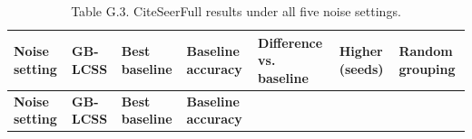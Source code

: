 \begin{longtable}[]{@{}
  >{\raggedright\arraybackslash}p{}
  >{\centering\arraybackslash}p{}
  >{\centering\arraybackslash}p{}
  >{\centering\arraybackslash}p{}
  >{\centering\arraybackslash}p{}
  >{\centering\arraybackslash}p{}
  >{\centering\arraybackslash}p{}@{}}
\caption{Table G.3. CiteSeerFull results under all five noise settings.}\tabularnewline
\toprule\noalign{}
\begin{minipage}[b]{\linewidth}\raggedright
\textbf{Noise setting}
\end{minipage} & \begin{minipage}[b]{\linewidth}\centering
\textbf{GB-LCSS}
\end{minipage} & \begin{minipage}[b]{\linewidth}\centering
\textbf{Best baseline}
\end{minipage} & \begin{minipage}[b]{\linewidth}\centering
\textbf{Baseline accuracy}
\end{minipage} & \begin{minipage}[b]{\linewidth}\centering
\textbf{Difference vs. baseline}
\end{minipage} & \begin{minipage}[b]{\linewidth}\centering
\textbf{Higher (seeds)}
\end{minipage} & \begin{minipage}[b]{\linewidth}\centering
\textbf{Random grouping}
\end{minipage} \\
\midrule\noalign{}
\endfirsthead
\toprule\noalign{}
\begin{minipage}[b]{\linewidth}\raggedright
\textbf{Noise setting}
\end{minipage} & \begin{minipage}[b]{\linewidth}\centering
\textbf{GB-LCSS}
\end{minipage} & \begin{minipage}[b]{\linewidth}\centering
\textbf{Best baseline}
\end{minipage} & \begin{minipage}[b]{\linewidth}\centering
\textbf{Baseline accuracy}
\end{minipage} & \begin{minipage}[b]{\linewidth}\centering

\end{minipage}
\end{longtable}
